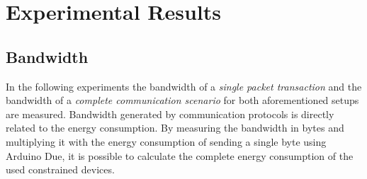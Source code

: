 \section{Experimental Results}\label{sec:experimentalresults}
\subsection{Bandwidth}
In the following experiments the bandwidth of a \emph{single packet transaction} and the bandwidth of a \emph{complete communication scenario} for both aforementioned setups are measured. 
Bandwidth generated by communication protocols is directly related to the energy consumption. By measuring the bandwidth in bytes and multiplying it with the energy consumption of sending a single byte using Arduino Due, it is possible to calculate the complete energy consumption of the used constrained devices. 

